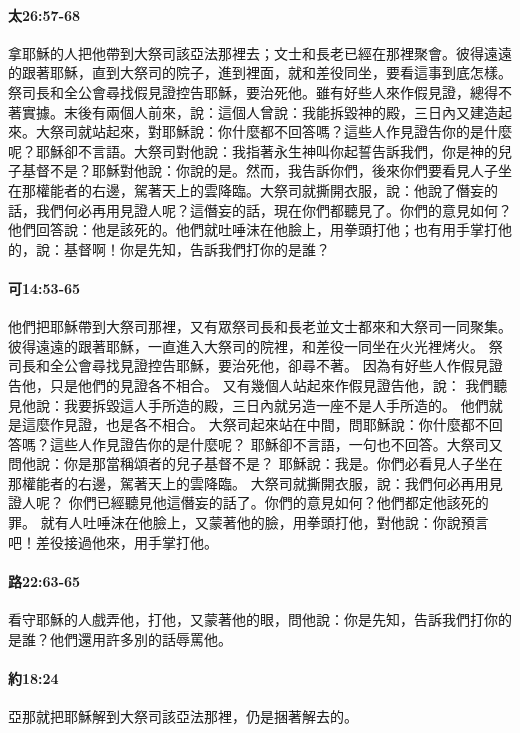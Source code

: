 \paragraph{太26:57-68} 
拿耶穌的人把他帶到大祭司該亞法那裡去；文士和長老已經在那裡聚會。彼得遠遠的跟著耶穌，直到大祭司的院子，進到裡面，就和差役同坐，要看這事到底怎樣。祭司長和全公會尋找假見證控告耶穌，要治死他。雖有好些人來作假見證，總得不著實據。末後有兩個人前來，說：這個人曾說：我能拆毀神的殿，三日內又建造起來。大祭司就站起來，對耶穌說：你什麼都不回答嗎？這些人作見證告你的是什麼呢？耶穌卻不言語。大祭司對他說：我指著永生神叫你起誓告訴我們，你是神的兒子基督不是？耶穌對他說：你說的是。然而，我告訴你們，後來你們要看見人子坐在那權能者的右邊，駕著天上的雲降臨。大祭司就撕開衣服，說：他說了僭妄的話，我們何必再用見證人呢？這僭妄的話，現在你們都聽見了。你們的意見如何？他們回答說：他是該死的。他們就吐唾沫在他臉上，用拳頭打他；也有用手掌打他的，說：基督啊！你是先知，告訴我們打你的是誰？


\paragraph{可14:53-65}
他們把耶穌帶到大祭司那裡，又有眾祭司長和長老並文士都來和大祭司一同聚集。
彼得遠遠的跟著耶穌，一直進入大祭司的院裡，和差役一同坐在火光裡烤火。
祭司長和全公會尋找見證控告耶穌，要治死他，卻尋不著。
因為有好些人作假見證告他，只是他們的見證各不相合。
又有幾個人站起來作假見證告他，說：
我們聽見他說：我要拆毀這人手所造的殿，三日內就另造一座不是人手所造的。
他們就是這麼作見證，也是各不相合。
大祭司起來站在中間，問耶穌說：你什麼都不回答嗎？這些人作見證告你的是什麼呢？
耶穌卻不言語，一句也不回答。大祭司又問他說：你是那當稱頌者的兒子基督不是？
耶穌說：我是。你們必看見人子坐在那權能者的右邊，駕著天上的雲降臨。
大祭司就撕開衣服，說：我們何必再用見證人呢？
你們已經聽見他這僭妄的話了。你們的意見如何？他們都定他該死的罪。
就有人吐唾沫在他臉上，又蒙著他的臉，用拳頭打他，對他說：你說預言吧！差役接過他來，用手掌打他。

\paragraph{路22:63-65}
看守耶穌的人戲弄他，打他，又蒙著他的眼，問他說：你是先知，告訴我們打你的是誰？他們還用許多別的話辱罵他。



\paragraph{約18:24}
亞那就把耶穌解到大祭司該亞法那裡，仍是捆著解去的。


